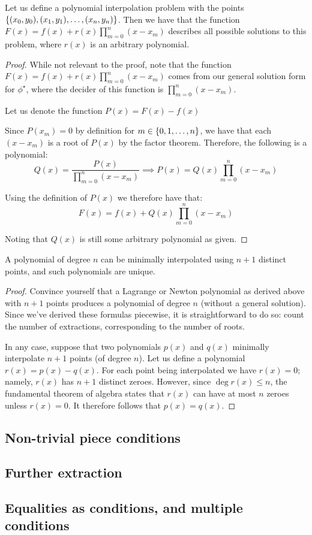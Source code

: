 \begin{theorem}
    Let us define a polynomial interpolation problem with the points $\{(x_0,y_0),(x_1,y_1),\dots,(x_n,y_n)\}$. Then we have that the function $F(x)=f(x)+r(x)\prod_{m=0}^{n}{(x-x_m)}$ describes all possible solutions to this problem, where $r(x)$ is an arbitrary polynomial.

    \begin{proof}
        While not relevant to the proof, note that the function $F(x)=f(x)+r(x)\prod_{m=0}^{n}{(x-x_m)}$ comes from our general solution form for $\phi^\star$, where the decider of this function is $\prod_{m=0}^{n}{(x-x_m)}$.

        Let us denote the function $P(x)=F(x)-f(x)$

        Since $P(x_m)=0$ by definition for $m\in\{0,1,\dots,n\}$, we have that each $(x-x_m)$ is a root of $P(x)$ by the factor theorem. Therefore, the following is a polynomial:
        $$
            Q(x)=\frac{P(x)}{\prod_{m=0}^{n}{(x-x_m)}}\implies P(x)=Q(x)\prod_{m=0}^{n}{(x-x_m)}
        $$

        Using the definition of $P(x)$ we therefore have that:
        $$
            F(x)=f(x)+Q(x)\prod_{m=0}^{n}{(x-x_m)}
        $$

        Noting that $Q(x)$ is still some arbitrary polynomial as given.
    \end{proof}
\end{theorem}

\begin{theorem}
    A polynomial of degree $n$ can be minimally interpolated using $n+1$ distinct points, and such polynomials are unique.

    \begin{proof}
        Convince yourself that a Lagrange or Newton polynomial as derived above with $n+1$ points produces a polynomial of degree $n$ (without a general solution). Since we've derived these formulas piecewise, it is straightforward to do so: count the number of extractions, corresponding to the number of roots.

        In any case, suppose that two polynomials $p(x)$ and $q(x)$ minimally interpolate $n+1$ points (of degree $n$). Let us define a polynomial $r(x)=p(x)-q(x)$. For each point being interpolated we have $r(x)=0$; namely, $r(x)$ has $n+1$ distinct zeroes. However, since $\deg{r(x)}\leq n$, the fundamental theorem of algebra states that $r(x)$ can have at most $n$ zeroes unless $r(x)=0$. It therefore follows that $p(x)=q(x)$.
    \end{proof}
\end{theorem}
\subsection{Non-trivial piece conditions}
\subsection{Further extraction}
\subsection{Equalities as conditions, and multiple conditions}
\newpage